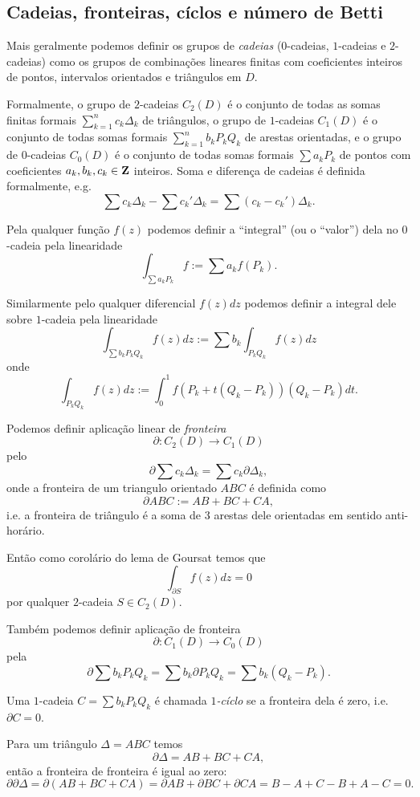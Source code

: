 \subsection{Cadeias, fronteiras,  cíclos e número de Betti}

Mais geralmente podemos definir os grupos de \emph{cadeias} ($0$-cadeias, $1$-cadeias e $2$-cadeias)
como os grupos de combinações lineares finitas com coeficientes inteiros de pontos, intervalos orientados e triângulos em $D$.

Formalmente, o grupo de $2$-cadeias $C_2(D)$ é o conjunto de todas as somas finitas formais $\sum_{k=1}^n c_k \Delta_k$ de triângulos,
o grupo de $1$-cadeias $C_1(D)$ é o conjunto de todas somas formais $\sum_{k=1}^n b_k P_kQ_k$ de arestas orientadas,
e o grupo de $0$-cadeias $C_0(D)$ é o conjunto de todas somas formais $\sum a_k P_k$ de pontos
com coeficientes $a_k,b_k,c_k \in \mathbf{Z}$ inteiros. Soma e diferença de cadeias é definida formalmente, e.g.
\[ \sum c_k \Delta_k - \sum c_k' \Delta_k = \sum (c_k - c_k') \Delta_k. \]

Pela qualquer função $f(z)$ podemos definir a ``integral'' (ou o ``valor'') dela no $0$-cadeia pela linearidade
\[ \int_{\sum a_k P_k} f := \sum a_k f(P_k). \]

Similarmente pelo qualquer diferencial $f(z) dz$ podemos definir a integral dele sobre $1$-cadeia pela linearidade
\[ \int_{\sum b_k P_kQ_k} f(z) dz := \sum b_k \int_{P_kQ_k} f(z) dz \]
onde 
\[ \int_{P_k Q_k} f(z) dz := \int_0^1 f(P_k + t(Q_k-P_k)) (Q_k-P_k) dt. \]

Podemos definir aplicação linear de \emph{fronteira}
\[ \partial: C_2(D) \to C_1(D) \]
pelo
\[ \partial \sum c_k \Delta_k = \sum c_k \partial \Delta_k, \]
onde a fronteira de um triangulo orientado $ABC$ é definida como 
\[ \partial ABC := AB + BC + CA, \]
i.e. a fronteira de triângulo é a soma de 3 arestas dele orientadas em sentido anti-horário.

Então como corolário do lema de Goursat temos que
\[ \int_{\partial S} f(z) dz = 0 \]
por qualquer $2$-cadeia $S \in C_2(D)$.

Também podemos definir aplicação de fronteira 
\[ \partial : C_1(D) \to C_0(D) \]
pela
\[ \partial \sum b_k P_k Q_k = \sum b_k \partial  P_kQ_k = \sum b_k (Q_k - P_k). \]

Uma $1$-cadeia $C = \sum b_k P_k Q_k$ é chamada \emph{$1$-cíclo} se a fronteira dela é zero, i.e. $\partial C = 0$.

Para um triângulo $\Delta = ABC$ temos
\[
\partial \Delta = AB + BC + CA,
\]
então a fronteira de fronteira é igual ao zero:
\[
\partial \partial \Delta = \partial (AB + BC + CA)  = \partial AB + \partial BC + \partial CA = B-A + C-B + A-C = 0.
\]

